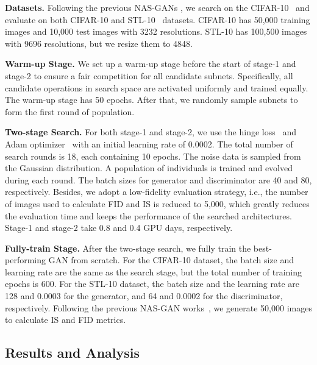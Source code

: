 \documentclass[runningheads]{llncs}
\begin{document}
\textbf{Datasets.} Following the previous NAS-GANs \cite{autoGAN,Adversarialnas,EGAN}, we search on the CIFAR-10~\cite{cifar10} and evaluate on both CIFAR-10 and STL-10~\cite{stl10} datasets. CIFAR-10 has 50,000 training images and 10,000 test images with 3232 resolutions. STL-10 has 100,500 images with 9696 resolutions, but we resize them to 4848.

\textbf{Warm-up Stage.} We set up a warm-up stage before the start of stage-1 and stage-2 to ensure a fair competition for all candidate subnets. Specifically, all candidate operations in search space are activated uniformly and trained equally. The warm-up stage has 50 epochs. After that, we randomly sample  subnets to form the first round of population.






\textbf{Two-stage Search.} For both stage-1 and stage-2, we use the hinge loss~\cite{SNGAN} and Adam optimizer~\cite{adam} with an initial learning rate of 0.0002. The total number of search rounds is 18, each containing 10 epochs. The noise data is sampled from the Gaussian distribution. A population of  individuals is trained and evolved during each round. The batch sizes for generator and discriminator are 40 and 80, respectively. Besides, we adopt a low-fidelity evaluation strategy, i.e., the number of images used to calculate FID and IS is reduced to 5,000, which greatly reduces the evaluation time and keeps the performance of the searched architectures. Stage-1 and stage-2 take 0.8 and 0.4 GPU days, respectively.



\textbf{Fully-train Stage.} After the two-stage search, we fully train the best-performing GAN  from scratch. For the CIFAR-10 dataset, the batch size and learning rate are the same as the search stage, but the total number of training epochs is 600. For the STL-10 dataset, the batch size and the learning rate are 128 and 0.0003 for the generator, and 64 and 0.0002 for the discriminator, respectively. Following the previous NAS-GAN works~\cite{Adversarialnas,autoGAN}, we generate 50,000 images to calculate IS and FID metrics.




\subsection{Results and Analysis}
\end{document}
